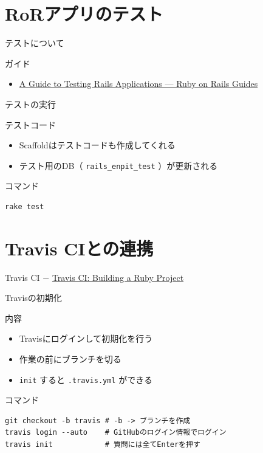 \documentclass[t, aspectratio=169]{beamer}
\begin{document}
\section{RoRアプリのテスト}
\label{sec-7-2}
\begin{frame}[label=sec-7-2-1]{テストについて}
\begin{block}{ガイド}
\begin{itemize}
\item \href{http://guides.rubyonrails.org/testing.html}{A Guide to Testing Rails Applications — Ruby on Rails Guides}
\end{itemize}
\end{block}
\end{frame}

\begin{frame}[fragile,label=sec-7-2-2]{テストの実行}
 \begin{block}{テストコード}
\begin{itemize}
\item Scaffoldはテストコードも作成してくれる
\item テスト用のDB（ \texttt{rails\_enpit\_test} ）が更新される
\end{itemize}
\end{block}
\begin{block}{コマンド}
\begin{verbatim}
rake test
\end{verbatim}
\end{block}
\end{frame}

\section{Travis CIとの連携}
\label{sec-7-3}
\begin{frame}[label=sec-7-3-1]{Travis CI}
− \href{http://docs.travis-ci.com/user/languages/ruby/}{Travis CI: Building a Ruby Project}
\end{frame}

\begin{frame}[fragile,label=sec-7-3-2]{Travisの初期化}
 \begin{block}{内容}
\begin{itemize}
\item Travisにログインして初期化を行う
\item 作業の前にブランチを切る
\item \texttt{init} すると \texttt{.travis.yml} ができる
\end{itemize}
\end{block}
\begin{block}{コマンド}
\begin{verbatim}
git checkout -b travis # -b -> ブランチを作成
travis login --auto    # GitHubのログイン情報でログイン
travis init            # 質問には全てEnterを押す
\end{verbatim}
\end{block}
\end{frame}
\end{document}
